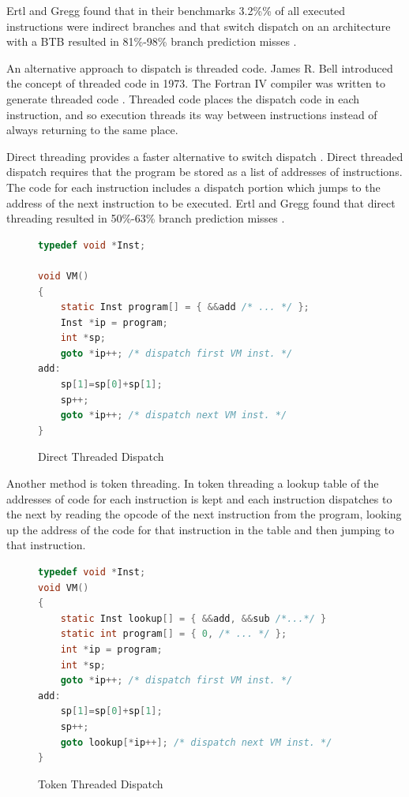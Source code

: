 \documentclass[english,a4paper,12pt]{report}
\begin{document}
Ertl and Gregg found that in their benchmarks 3.2\%\% of
all executed instructions were indirect branches and that switch
dispatch on an architecture with a BTB resulted in 81\%-98\% branch
prediction misses \cite{EfficientInterpreters}.

An alternative approach to dispatch is threaded code. James R. Bell
introduced the concept of threaded code in 1973. The Fortran IV
compiler was written to generate threaded code \cite{Bell}. Threaded
code places the dispatch code in each instruction, and so execution
threads its way between instructions instead of always returning to
the same place.

Direct threading provides a faster alternative to switch dispatch
\cite{Ertl}. Direct threaded dispatch requires that the program be
stored as a list of addresses of instructions. The code for each
instruction includes a dispatch portion which jumps to the address of
the next instruction to be executed. Ertl and Gregg found that direct
threading resulted in 50\%-63\% branch prediction misses
\cite{EfficientInterpreters}.

\begin{figure}[!htb]
  \begin{lstlisting}[language=C]
typedef void *Inst; 

void VM() 
{ 
    static Inst program[] = { &&add /* ... */ }; 
    Inst *ip = program; 
    int *sp; 
    goto *ip++; /* dispatch first VM inst. */ 
add: 
    sp[1]=sp[0]+sp[1]; 
    sp++; 
    goto *ip++; /* dispatch next VM inst. */ 
}
  \end{lstlisting}
  \caption[Direct Threaded Dispatch]{Direct Threaded Dispatch\cite{Ertl}}
  \label{fig:direct}
\end{figure}

Another method is token threading. In token threading a lookup table
of the addresses of code for each instruction is kept and each
instruction dispatches to the next by reading the opcode of the next
instruction from the program, looking up the address of the code for
that instruction in the table and then jumping to that instruction.

\begin{figure}[!htb]
  \begin{lstlisting}[language=C]
typedef void *Inst;
void VM() 
{ 
    static Inst lookup[] = { &&add, &&sub /*...*/ }
    static int program[] = { 0, /* ... */ }; 
    int *ip = program; 
    int *sp; 	
    goto *ip++; /* dispatch first VM inst. */ 
add: 
    sp[1]=sp[0]+sp[1]; 
    sp++; 
    goto lookup[*ip++]; /* dispatch next VM inst. */ 
}
  \end{lstlisting}
  \caption[Token Threaded Dispatch]{Token Threaded Dispatch\cite{Ertl}}
  \label{fig:indirect}
\end{figure}
\end{document}
